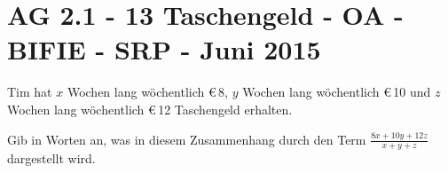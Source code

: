 \section{AG 2.1 - 13 Taschengeld - OA - BIFIE - SRP - Juni 2015}

\begin{beispiel}[AG 2.1]{1} %
Tim hat $x$ Wochen lang wöchentlich \euro\,8, $y$ Wochen lang wöchentlich \euro\,10 und $z$ Wochen lang
wöchentlich \euro\,12 Taschengeld erhalten. \leer

Gib in Worten an, was in diesem Zusammenhang durch den Term $\frac{8x + 10y +12z}{x+y+z}$ dargestellt wird.

\end{beispiel}
